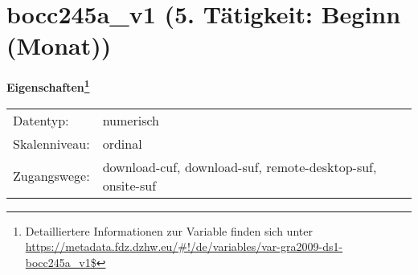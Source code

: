 
    \setcounter{footnote}{0}

    \vspace*{-1.8cm}
	\section{bocc245a\_v1 (5. Tätigkeit: Beginn (Monat))}
	\label{section:bocc245a_v1}



    \vspace*{0.5cm}
    \noindent\textbf{Eigenschaften\footnote{Detailliertere Informationen zur Variable finden sich unter
		\url{https://metadata.fdz.dzhw.eu/\#!/de/variables/var-gra2009-ds1-bocc245a_v1$}}}\\
	\begin{tabularx}{\hsize}{@{}lX}
	Datentyp: & numerisch \\
	Skalenniveau: & ordinal \\
	Zugangswege: &
	  download-cuf, 
	  download-suf, 
	  remote-desktop-suf, 
	  onsite-suf
 \\
    \end{tabularx}



